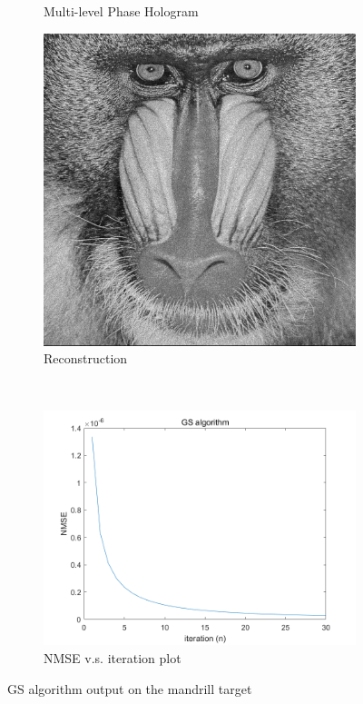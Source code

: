 \begin{figure}[H]
\begin{subfigure}[t]{0.3\textwidth}
    \caption{Multi-level Phase Hologram}
    \label{fig:GS_holo_i_30}
  \end{subfigure}
  \hfill
  \begin{subfigure}[t]{0.3\textwidth}
    \centering
    \includegraphics[width=\textwidth]{GS_recon_i_30.png}
    \caption{Reconstruction}
    \label{fig:GS_recon_i_30}
  \end{subfigure}
  \\
  \begin{subfigure}[t]{0.7\textwidth}
    \centering
    \includegraphics[width=\textwidth]{GS_NMSE_plot.png}
    \caption{NMSE v.s. iteration plot}
    \label{fig:GS_NMSE_plot}
  \end{subfigure}
  \caption{GS algorithm output on the mandrill target}
  \label{fig:GS algorithm output on the mandrill target}
\end{figure}
